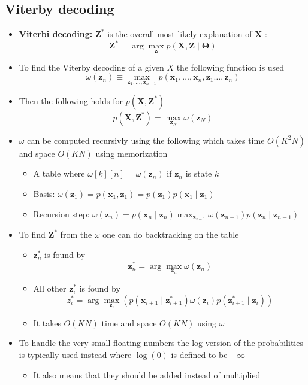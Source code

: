 \documentclass[a4, english]{article}
\begin{document}
\subsection{Viterby decoding}
\begin{itemize}
	\item \textbf{Viterbi decoding:} $\pmb Z^*$ is the overall most likely explanation of $\pmb X$ :
\begin{equation*}
  \pmb Z^* = \arg\max_{\pmb{z}} p(\pmb X, \pmb Z \mid \pmb \Theta)
\end{equation*}
  \item To find the Viterby decoding of a given $X$ the following function is used   
\begin{equation*}
  \omega (\pmb z_n) \equiv \max_{\pmb z_1, \dots, \pmb z_{n-1}} p(\pmb x_1, \dots, \pmb x_n, \pmb z_1 \dots, \pmb z_n)
\end{equation*}
  \item Then the following holds for $p(\pmb X, \pmb Z^*)$ 
\begin{equation*}
	p(\pmb X, \pmb Z^*) = \max_{\pmb z_N} \omega (\pmb z_N)
\end{equation*}
  \item $\omega$ can be computed recursivly using the following which takes time $O(K^2N)$ and space $O(KN)$ using memorization
  \begin{itemize}
	  \item A table where $\omega[k][n] = \omega(\pmb z_n)$ if $\pmb z_n$ is state $k$
	  \item Basis: $\omega (\pmb z_1) = p(\pmb x_1, \pmb z_1) = p(\pmb z_1) p(\pmb x_1 \mid \pmb z_1)$
	  \item Recursion step: $\omega (\pmb z_n) = p(\pmb x_n \mid \pmb z_n) \max_{\pmb z_{z-1}} \omega (\pmb z_{n-1}) p(\pmb z_n \mid \pmb z_{n-1})$
  \end{itemize}
  \item To find $\pmb Z^*$ from the $\omega$ one can do backtracking on the table 
  \begin{itemize}
    \item $\pmb z^*_n$ is found by 
\begin{equation*}
  \pmb z^*_n = \arg \max_{\pmb z_n} \omega (\pmb z_n)
\end{equation*}
    \item All other $\pmb z^*_i$ is found by
\begin{equation*}
  z^*_i = \arg \max_{\pmb z_i} (p(\pmb x_{i+1} \mid \pmb z^*_{i+1}) \omega(\pmb z_i) p(\pmb z_{i+1}^* \mid \pmb z_i))
\end{equation*}
  	\item It takes $O(KN)$ time and space $O(KN)$ using $\omega$ 
  \end{itemize}
  \item To handle the very small floating numbers the log version of the probabilities is typically used instead where $\log(0)$ is defined to be $- \infty$ 
  \begin{itemize}
  	\item It also means that they should be added instead of multiplied
  \end{itemize}
\end{itemize}
\end{document}
